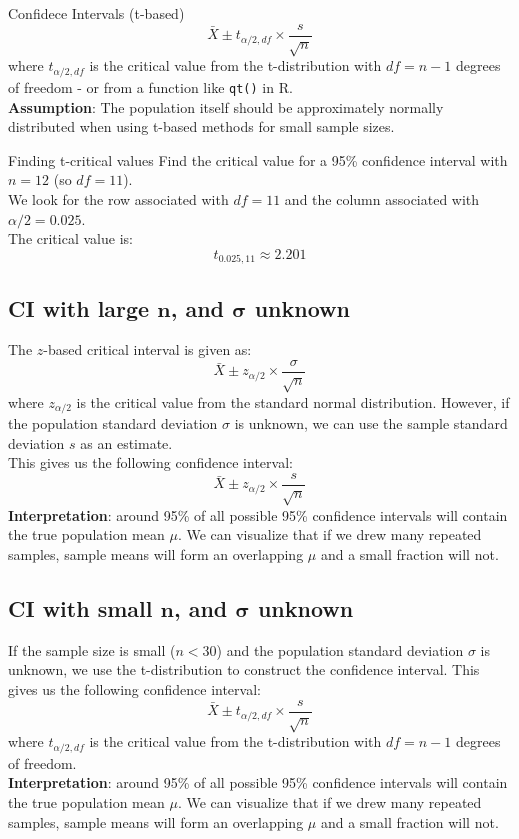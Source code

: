 \documentclass[10pt]{extarticle}
\begin{document}
\vfill
\begin{definitionbox}{Confidece Intervals (t-based)}{}
    $$\bar{X} \pm t_{\alpha/2, df} \times \frac{s}{\sqrt{n}}$$
    where $t_{\alpha/2, df}$ is the critical value from the t-distribution with $df = n - 1$ degrees of freedom - or from a function like \texttt{qt()} in R.\\

    \textbf{Assumption}: The population itself should be approximately normally distributed when using t-based methods for small sample sizes.
\end{definitionbox}
\vfill
\begin{examplebox}{Finding t-critical values}{}
    Find the critical value for a 95\% confidence interval with $n = 12$ (so $df = 11$).\\
    We look for the row associated with $df = 11$ and the column associated with $\alpha/2 = 0.025$.\\
    The critical value is:
    $$t_{0.025, 11} \approx 2.201$$
\end{examplebox}
\pagebreak
\subsection{CI with large $\boldsymbol{n}$, and $\boldsymbol{\sigma}$ unknown}
The $z$-based critical interval is given as:
$$\bar{X} \pm z_{\alpha/2} \times \frac{\sigma}{\sqrt{n}}$$
where $z_{\alpha/2}$ is the critical value from the standard normal distribution.
However, if the population standard deviation $\sigma$ is unknown, we can use the sample standard deviation $s$ as an estimate.\\
This gives us the following confidence interval:
$$\bar{X} \pm z_{\alpha/2} \times \frac{s}{\sqrt{n}}$$
\textbf{Interpretation}: around 95\% of all possible 95\% confidence intervals will contain the true population mean $\mu$. We can visualize that if we drew many repeated samples, sample means will form an overlapping $\mu$ and a small fraction will not.

\subsection{CI with small $\boldsymbol{n}$, and $\boldsymbol{\sigma}$ unknown}
If the sample size is small ($n < 30$) and the population standard deviation $\sigma$ is unknown, we use the t-distribution to construct the confidence interval. This gives us the following confidence interval:
$$\bar{X} \pm t_{\alpha/2, df} \times \frac{s}{\sqrt{n}}$$
where $t_{\alpha/2, df}$ is the critical value from the t-distribution with $df = n - 1$ degrees of freedom.\\
\textbf{Interpretation}: around 95\% of all possible 95\% confidence intervals will contain the true population mean $\mu$. We can visualize that if we drew many repeated samples, sample means will form an overlapping $\mu$ and a small fraction will not.
\end{document}
